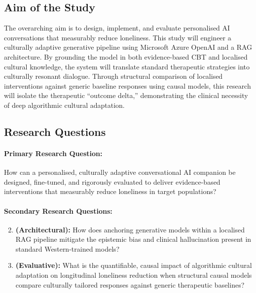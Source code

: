 \documentclass[12pt,a4paper]{article}
\begin{document}
\subsection{Aim of the Study}

The overarching aim is to design, implement, and evaluate personalised AI conversations that measurably reduce loneliness. This study will engineer a culturally adaptive generative pipeline using Microsoft Azure OpenAI and a RAG architecture. By grounding the model in both evidence-based CBT and localised cultural knowledge, the system will translate standard therapeutic strategies into culturally resonant dialogue. Through structural comparison of localised interventions against generic baseline responses using causal models, this research will isolate the therapeutic ``outcome delta,'' demonstrating the clinical necessity of deep algorithmic cultural adaptation.

\subsection{Research Questions}

\paragraph{Primary Research Question:}
How can a personalised, culturally adaptive conversational AI companion be designed, fine-tuned, and rigorously evaluated to deliver evidence-based interventions that measurably reduce loneliness in target populations?

\paragraph{Secondary Research Questions:}
\begin{enumerate}[label=\textbf{RQ\arabic*:},leftmargin=2cm]
  \setcounter{enumi}{1}
  \item[\textbf{RQ2a}] \textbf{(Architectural):} How does anchoring generative models within a localised RAG pipeline mitigate the epistemic bias and clinical hallucination present in standard Western-trained models?
  \item[\textbf{RQ2b}] \textbf{(Evaluative):} What is the quantifiable, causal impact of algorithmic cultural adaptation on longitudinal loneliness reduction when structural causal models compare culturally tailored responses against generic therapeutic baselines?
\end{enumerate}
\end{document}
